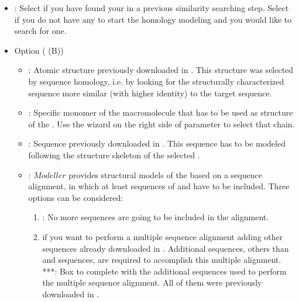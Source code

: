 \begin{itemize}
\begin{itemize}
                        \begin{itemize}
                        \item {}: Select  if you have found your  in a previous similarity searching step. Select  if you do not have any  to start the homology modeling and you would like to search for one.
                        \item Option  ( (B))
                                        \begin{itemize}
                                                \item {}: Atomic structure previously downloaded in \scipion. This structure was selected by sequence homology, i.e. by looking for the structurally characterized sequence more similar (with higher identity) to the target sequence.
                                                \item {}: Specific monomer of the macromolecule that has to be used as structure  of the . Use the wizard on the right side of  parameter to select that chain.
                                                \item {}: Sequence previously downloaded in \scipion. This sequence has to be modeled following the structure skeleton of the selected .
                                                \item {}: $Modeller$ provides structural models of the  based on a sequence alignment, in which at least sequences of  and  have to be included. Three options can be considered:
                                                \begin{enumerate}
                                                \item {}: No more sequences are going to be included in the alignment. 
                                                \item {} if you want to perform a multiple sequence alignment adding other sequences already downloaded in \scipion. Additional sequences, others than  and  sequences, are required to accomplish this multiple alignment. 
                                                     ***: Box to complete with the additional sequences used to perform the multiple sequence alignment. All of them were previously downloaded in \scipion.

\end{enumerate}
\end{itemize}
\end{itemize}
\end{itemize}
\end{itemize}
